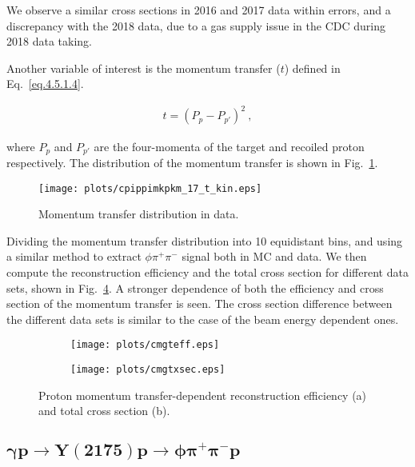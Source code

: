 We observe a similar cross sections in 2016 and 2017 data within errors, and a discrepancy with the 2018 data, due to a gas supply issue in the CDC during 2018 data taking.  
\par Another variable of interest is the momentum transfer ($t$) defined in Eq.~\ref{eq.4.5.1.4}.

\begin{equation}
    \label{eq.4.5.1.4}
    \begin{aligned}
        t = (P_{p} - P_{p'})^2~, 
    \end{aligned}
\end{equation}

where $P_{p}$ and $P_{p'}$ are the four-momenta of the target and recoiled proton respectively. The distribution of the momentum transfer is shown in Fig.~\ref{fig.4.5.1.5}.

\begin{figure}[H]
    \centering
    \texttt{[image: plots/cpippimkpkm\_17\_t\_kin.eps]}
    \caption{\label{fig.4.5.1.5}Momentum transfer distribution in data.}
\end{figure}

Dividing the momentum transfer distribution into 10 equidistant bins, and using a similar method to extract $\phi \pi^+ \pi^-$ signal both in MC and data. We then compute the reconstruction efficiency and the total cross section for different data sets, shown in Fig.~\ref{fig.4.5.1.6}. A stronger dependence of both the efficiency and cross section of the momentum transfer is seen. The cross section difference between the different data sets is similar to the case of the beam energy dependent ones. 

\begin{figure}[H]
    \centering
    \begin{subfigure}[b]{0.45\textwidth}
        \texttt{[image: plots/cmgteff.eps]}
        \caption{}
        \label{fig.4.5.1.6.a}
    \end{subfigure}
    \begin{subfigure}[b]{0.45\textwidth}
        \texttt{[image: plots/cmgtxsec.eps]}
        \caption{}
        \label{fig.4.5.1.6.b}
    \end{subfigure}
    \caption{Proton momentum transfer-dependent reconstruction efficiency (a) and total cross section (b).}
    \label{fig.4.5.1.6}
\end{figure}

\subsection{\texorpdfstring{$\bm{\gamma p \rightarrow Y(2175) p \rightarrow \phi \pi^{+} \pi^{-} p}$}{}}
\label{p.4.5.2}

